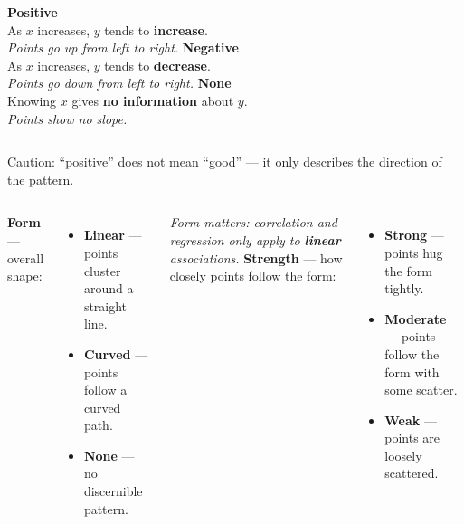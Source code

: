 \documentclass[aspectratio=169, 11pt]{beamer}
\begin{document}
\begin{frame}[t, plain]
  \vspace{0.3cm}
  \begin{columns}
      \textbf{Positive}\\
      As $x$ increases, $y$ tends to \textbf{increase}.\\[0.2cm]
      \textit{Points go up from left to right.}
      \textbf{Negative}\\
      As $x$ increases, $y$ tends to \textbf{decrease}.\\[0.2cm]
      \textit{Points go down from left to right.}
      \textbf{None}\\
      Knowing $x$ gives \textbf{no information} about $y$.\\[0.2cm]
      \textit{Points show no slope.}
  \end{columns}
  \vspace{0.8cm}
  \textcolor{navy!70}{\small Caution: ``positive'' does not mean ``good'' --- it only describes the direction of the pattern.}
\end{frame}

\begin{frame}[t, plain]
  \vspace{0.3cm}
  \begin{columns}
      \textbf{Form} --- overall shape:
      \begin{itemize}
        \item \textbf{Linear} --- points cluster around a straight line.
        \item \textbf{Curved} --- points follow a curved path.
        \item \textbf{None} --- no discernible pattern.
      \end{itemize}
      \vspace{0.3cm}
      \textit{Form matters: correlation and regression only apply to \textbf{linear} associations.}
      \textbf{Strength} --- how closely points follow the form:
      \begin{itemize}
        \item \textbf{Strong} --- points hug the form tightly.
        \item \textbf{Moderate} --- points follow the form with some scatter.
        \item \textbf{Weak} --- points are loosely scattered.
      \end{itemize}
  \end{columns}
\end{frame}
\end{document}
